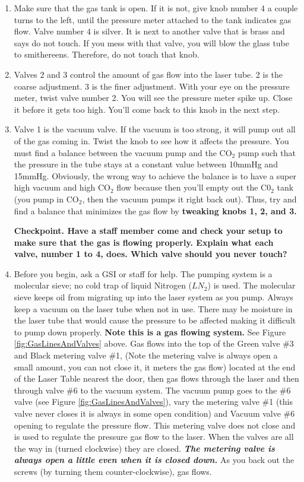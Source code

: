 \documentclass{../lab}
\begin{document}
\begin{enumerate}
    \item Make sure that the gas tank is open. If it is not, give knob number 4 a couple turns to the left, until the pressure meter attached to the tank indicates gas flow. Valve number 4 is silver. It is next to another valve that is brass and says do not touch. If you mess with that valve, you will blow the glass tube to smithereens. Therefore, do not touch that knob.
    
    \item Valves 2 and 3 control the amount of gas flow into the laser tube. 2 is the coarse adjustment. 3 is the finer adjustment. With your eye on the pressure meter, twist valve number 2. You will see the pressure meter spike up. Close it before it gets too high. You'll come back to this knob in the next step.
    
    \item Valve 1 is the vacuum valve. If the vacuum is too strong, it will pump out all of the gas coming in. Twist the knob to see how it affects the pressure. You must find a balance between the vacuum pump and the CO$_2$ pump such that the pressure in the tube stays at a constant value between 10mmHg and 15mmHg. Obviously, the wrong way to achieve the balance is to have a super high vacuum and high CO$_2$ flow because then you'll empty out the C0$_2$ tank (you pump in CO$_2$, then the vacuum pumps it right back out).  Thus, try and find a balance that minimizes the gas flow by \textbf{tweaking knobs 1, 2, and 3.}


\textbf{Checkpoint.  Have a staff member come and check your setup to make sure that the gas is flowing properly. Explain what each valve, number 1 to 4, does. Which valve should you never touch?}


    \item Before you begin, ask a GSI or staff for help. The pumping system is a molecular sieve; no cold trap of liquid Nitrogen ($LN_2$) is used. The molecular sieve keeps oil from migrating up into the laser system as you pump. Always keep a vacuum on the laser tube when not in use. There may be moisture in the laser tube that would cause the pressure to be affected making it difficult to pump down properly. \textbf{Note this is a gas flowing system.} See Figure \ref{fig:GasLinesAndValves} above. Gas flows into the top of the Green valve \#3 and Black metering valve \#1, (Note the metering valve is always open a small amount, you can not close it, it meters the gas flow) located at the end of the Laser Table nearest the door, then gas flows through the laser and then through valve \#6 to the vacuum system. The vacuum pump goes to the \#6 valve (see Figure \ref{fig:GasLinesAndValves}), vary the metering valve \#1 (this valve never closes it is always in some open condition) and Vacuum valve \#6 opening to regulate the pressure flow. This metering valve does not close and is used to regulate the pressure gas flow to the laser. When the valves are all the way in (turned clockwise) they are closed. \emph{\textbf{The metering valve is always open a little even when it is closed down.}} As you back out the screws (by turning them counter-clockwise), gas flows.


\end{enumerate}
\end{document}
